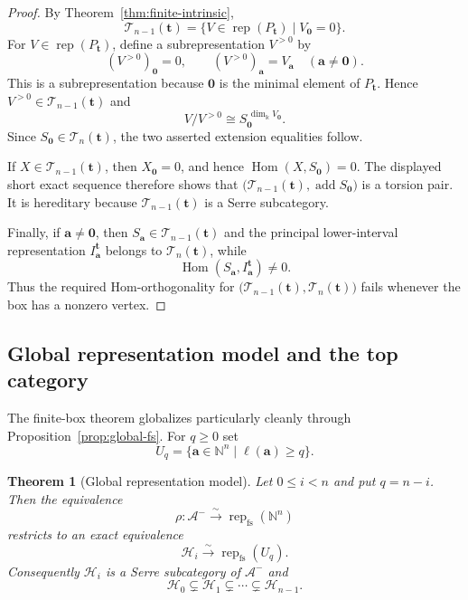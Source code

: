 \documentclass[10pt,a4paper]{amsart}
\newtheorem{theorem}{Theorem}[section]
\newcommand{\Rep}{\operatorname{rep}}
\newcommand{\Hom}{\operatorname{Hom}}
\begin{document}
\begin{proof}
By Theorem~\ref{thm:finite-intrinsic},
\[
\mathcal T_{n-1}(\mathbf t)
=
\{V\in\Rep(P_{\mathbf t})\mid V_{\mathbf0}=0\}.
\]
For $V\in\Rep(P_{\mathbf t})$, define a subrepresentation $V^{>0}$ by
\[
(V^{>0})_{\mathbf0}=0,
\qquad
(V^{>0})_{\mathbf a}=V_{\mathbf a}
\quad(\mathbf a\ne\mathbf0).
\]
This is a subrepresentation because $\mathbf0$ is the minimal element of
$P_{\mathbf t}$.  Hence
$V^{>0}\in\mathcal T_{n-1}(\mathbf t)$ and
\[
V/V^{>0}\cong
S_{\mathbf0}^{\,\dim_\Bbbk V_{\mathbf0}}.
\]
Since $S_{\mathbf0}\in\mathcal T_n(\mathbf t)$, the two asserted
extension equalities follow.

If $X\in\mathcal T_{n-1}(\mathbf t)$, then $X_{\mathbf0}=0$, and hence
$\Hom(X,S_{\mathbf0})=0$.  The displayed short exact sequence therefore
shows that
$\bigl(\mathcal T_{n-1}(\mathbf t),\operatorname{add}S_{\mathbf0}\bigr)$
is a torsion pair.  It is hereditary because
$\mathcal T_{n-1}(\mathbf t)$ is a Serre subcategory.

Finally, if $\mathbf a\ne\mathbf0$, then
$S_{\mathbf a}\in\mathcal T_{n-1}(\mathbf t)$ and the principal
lower-interval representation
$I^{\mathbf t}_{\mathbf a}$ belongs to $\mathcal T_n(\mathbf t)$,
while
\[
\Hom(S_{\mathbf a},I^{\mathbf t}_{\mathbf a})\ne0.
\]
Thus the required Hom-orthogonality for
$\bigl(\mathcal T_{n-1}(\mathbf t),\mathcal T_n(\mathbf t)\bigr)$
fails whenever the box has a nonzero vertex.
\end{proof}


\subsection{Global representation model and the top category}\label{sec:global}

The finite-box theorem globalizes particularly cleanly through Proposition~\ref{prop:global-fs}.  For $q\ge0$ set
\[
U_q=\{\mathbf a\in\mathbb N^n\mid \ell(\mathbf a)\ge q\}.
\]

\begin{theorem}[Global representation model]\label{thm:global-model}
Let $0\le i<n$ and put $q=n-i$.  Then the equivalence
\[
\rho:\mathcal A^-\xrightarrow{\sim}\Rep_{\mathrm{fs}}(\mathbb N^n)
\]
restricts to an exact equivalence
\[
\mathcal H_i\xrightarrow{\sim}\Rep_{\mathrm{fs}}(U_q).
\]
Consequently $\mathcal H_i$ is a Serre subcategory of $\mathcal A^-$ and
\[
\mathcal H_0\subsetneq\mathcal H_1\subsetneq\cdots\subsetneq\mathcal H_{n-1}.
\]
\end{theorem}
\end{document}
